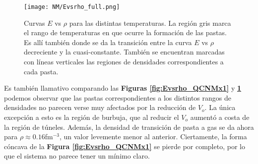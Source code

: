 \begin{figure}[H]
	\centering
	\texttt{[image: NM/Evsrho\_full.png]}
	\caption{Curvas $E$ vs $\rho$ para las distintas temperaturas. 
	La región gris marca el rango de temperaturas en que ocurre la formación de las pastas.
	Es allí también donde se da la transición entre la curva $E$ vs $\rho$ decreciente y la cuasi-constante.
	También se encuentran marcadas con líneas verticales las regiones de densidades correspondientes a cada pasta.}
	\label{fig:Evsrho_QCNMx0,5}
\end{figure}

Es también llamativo comparando las \textbf{Figuras \ref{fig:Evsrho_QCNMx1}} y \textbf{\ref{fig:Evsrho_QCNMx0,5}} podemos observar que las pastas correspondientes a los distintos rangos de densidades
no parecen verse muy afectados por la reducción de $V_o$. 
La única excepción a esto es la región de burbuja, que al reducir el $V_o$ aumentó a costa de la región de túneles. 
Además, la densidad de transición de pasta a gas se da ahora para $\rho \approx 0.16$fm$^{-3}$, un valor levemente menor al anterior. 
Ciertamente, la forma cóncava de la \textbf{Figura \ref{fig:Evsrho_QCNMx1}} se pierde por completo, por lo que el sistema no parece tener un mínimo claro.
